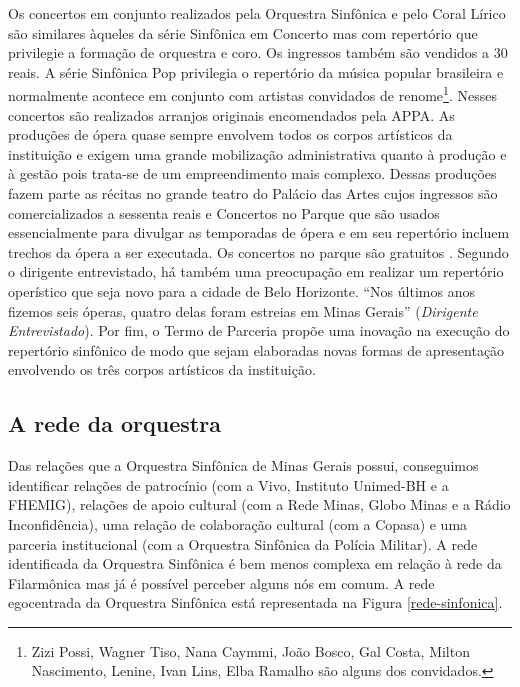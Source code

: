 \documentclass[a4paper, 12pt, openright, oneside, german, french, english, brazil]{abntex2}
\begin{document}
	Os concertos em conjunto realizados pela Orquestra Sinfônica e pelo Coral Lírico são similares àqueles da série Sinfônica em Concerto mas com repertório que privilegie a formação de orquestra e coro. Os ingressos também são vendidos a 30 reais. A série Sinfônica Pop privilegia o repertório da música popular brasileira e normalmente acontece em conjunto com artistas convidados de renome\footnote{Zizi Possi, Wagner Tiso, Nana Caymmi, João Bosco, Gal Costa, Milton Nascimento, Lenine, Ivan Lins, Elba Ramalho são alguns dos convidados.}. Nesses concertos são realizados arranjos originais encomendados pela APPA. As produções de ópera quase sempre envolvem todos os corpos artísticos da instituição e exigem uma grande mobilização administrativa quanto à produção e à gestão pois trata-se de um empreendimento mais complexo. Dessas produções fazem parte as récitas no grande teatro do Palácio das Artes cujos ingressos são comercializados a sessenta reais e Concertos no Parque que são usados essencialmente para divulgar as temporadas de ópera e em seu repertório incluem trechos da ópera a ser executada. Os concertos no parque são gratuitos \cite{appa2017parceria}. Segundo o dirigente entrevistado, há também uma preocupação em realizar um repertório operístico que seja novo para a cidade de Belo Horizonte. ``Nos últimos anos fizemos seis óperas, quatro delas foram estreias em Minas Gerais'' (\textit{Dirigente Entrevistado}). Por fim, o Termo de Parceria propõe uma inovação na execução do repertório sinfônico de modo que sejam elaboradas novas formas de apresentação envolvendo os três corpos artísticos da instituição. 
	
	\subsection{A rede da orquestra}
	
	Das relações que a Orquestra Sinfônica de Minas Gerais possui, conseguimos identificar relações de patrocínio (com a Vivo, Instituto Unimed-BH e a FHEMIG), relações de apoio cultural (com a Rede Minas, Globo Minas e a Rádio Inconfidência), uma relação de colaboração cultural (com a Copasa) e uma parceria institucional (com a Orquestra Sinfônica da Polícia Militar). A rede identificada da Orquestra Sinfônica é bem menos complexa em relação à rede da Filarmônica mas já é possível perceber alguns nós em comum. A rede egocentrada da Orquestra Sinfônica está representada na Figura \ref{rede-sinfonica}.
	
\end{document}
